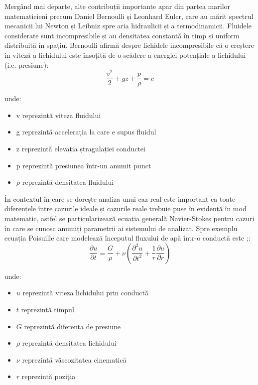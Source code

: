 Mergând mai departe, alte contribuții importante apar din partea marilor matematicieni precum Daniel Bernoulli și Leonhard Euler, care au mărit spectrul mecanicii lui Newton și Leibniz spre aria hidraulicii și a termodinamicii. Fluidele considerate sunt incompresibile și au densitatea constantă în timp și uniform distribuită în spațiu. Bernoulli afirmă despre lichidele incompresibile că o creștere în viteză a lichidului este însoțită de o scădere a energiei potențiale a lichidului (i.e. presiune):
\begin{equation}
\frac{v^2}{2} + gz + \frac{p}{\rho} = c
\end{equation}

unde:
\begin{itemize}
\item v reprezintă viteza fluidului
\item g reprezintă accelerația la care e supus fluidul
\item z reprezintă elevația ștragulației conductei
\item p reprezintă presiunea într-un anumit punct
\item $\rho$ reprezintă densitatea fluidului
\end{itemize}

În contextul în care se dorește analiza unui caz real este important ca toate diferențele între cazurile ideale și cazurile reale trebuie puse în evidență în mod matematic, astfel se particularizează ecuația generală Navier-Stokes pentru cazuri în care se cunosc anumiți parametrii ai sistemului de analizat. Spre exemplu ecuația Poisuille care modelează începutul fluxului de apă într-o conductă este ;\cite{elger2016engineering}:
\begin{equation}
\frac{\partial u}{\partial t} = \frac{G}{\rho} + \nu ( \frac{\partial^2 u}{\partial t^2} + \frac{1}{r}\frac{\partial u}{\partial{r}})
\end{equation}

unde:
\begin{itemize}
\item $u$ reprezintă viteza lichidului prin conductă
\item $t$ reprezintă timpul
\item $G$ reprezintă diferența de presiune
\item $\rho$ reprezintă densitatea lichidului
\item $\nu$ reprezintă vâscozitatea cinematică
\item $r$ reprezintă poziția
\end{itemize}

